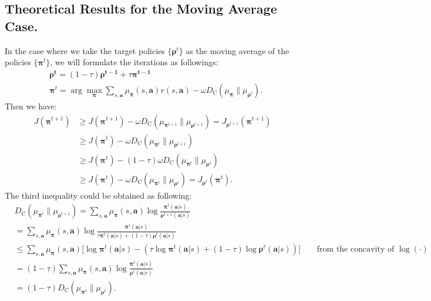 \documentclass{article}
\begin{document}
	\subsection{Theoretical Results for the Moving Average Case. }
	\label{sec:app-MA}
	    In the case where we take the target policies $\{\bm{\rho}^t\}$ as the moving average of the policies $\{\bm{\pi}^t\}$, we will formulate the iterations as followings:
    \begin{align*}
        &\boldsymbol{\rho^t} = (1-\tau)\boldsymbol{\rho^{t-1}} + \tau \boldsymbol{\pi^{t-1}} \\
        &\boldsymbol{\pi}^{t} = \arg \max_{{\boldsymbol{\pi}}} \sum_{s,\boldsymbol{a}} \mu_{\boldsymbol{\pi}}(s,\boldsymbol{a}) r(s,\boldsymbol{a})  - \omega D_{\operatorname{C}} \left( \mu_{\boldsymbol{\pi}} \| \mu_{{\boldsymbol{\rho}}^t} \right).
    \end{align*}
    Then we have:
    \begin{align*}
          J(\boldsymbol{\pi}^{t + 1})
        &\ge J(\boldsymbol{\pi}^{t + 1}) - \omega D_{\operatorname{C}} \left( \mu_{\boldsymbol{\pi}^{t+1}} \| \mu_{{\boldsymbol{\rho}}^{t+1}} \right) =  J_{{\boldsymbol{\rho}}^{t+1}}(\boldsymbol{\pi}^{t + 1}) \\ 
        & \ge J(\boldsymbol{\pi}^{t }) - \omega D_{\operatorname{C}} \left( \mu_{\boldsymbol{\pi}^{t}} \| \mu_{{\boldsymbol{\rho}}^{t+1}} \right) \\
        & \ge  J(\boldsymbol{\pi}^{t }) - (1-\tau)\omega D_{\operatorname{C}} \left( \mu_{\boldsymbol{\pi}^{t}} \| \mu_{{\boldsymbol{\rho}}^{t}} \right)
        \\
        & \ge J(\boldsymbol{\pi}^{t }) - \omega D_{\operatorname{C}} \left( \mu_{\boldsymbol{\pi}^{t}} \| \mu_{{\boldsymbol{\rho}}^{t}} \right) =  J_{{\boldsymbol{\rho}}^{t}}(\boldsymbol{\pi}^{t}).   
    \end{align*}
    The third inequality could be obtained as following:
    \begin{align*}
     & D_{\operatorname{C}} \left( \mu_{\boldsymbol{\pi}^{t}} \| \mu_{{\boldsymbol{\rho}}^{t+1}} \right)  = \sum_{s,\boldsymbol{a}} \mu_{\boldsymbol{\pi}}(s,\boldsymbol{a}) \log \frac{{\bm{\pi}}^t(\bm{a}|s)}{{\bm{\rho}}^{t+1}(\bm{a}|s)} \\
         & = \sum_{s,\boldsymbol{a}} \mu_{\boldsymbol{\pi}}(s,\boldsymbol{a}) \log \frac{{\bm{\pi}}^t(\bm{a}|s)}{\tau{\bm{\pi}}^{t}(\bm{a}|s) + (1-\tau){\bm{\rho}}^t(\bm{a}|s) } \\
         & \le \sum_{s,\boldsymbol{a}} \mu_{\boldsymbol{\pi}}(s,\boldsymbol{a}) \bigg[\log {\bm{\pi}}^t(\bm{a}|s) - \left(\tau \log {\bm{\pi}}^{t}(\bm{a}|s) + (1-\tau) \log {\bm{\rho}}^t(\bm{a}|s)  \right) \bigg] \qquad \text{from the concavity of $\log(\cdot)$} \\
         & = (1-\tau)\sum_{s,\boldsymbol{a}} \mu_{\boldsymbol{\pi}}(s,\boldsymbol{a}) \log \frac{{\bm{\pi}}^t(\bm{a}|s)}{{\bm{\rho}}^{t}(\bm{a}|s)} \\
         & = (1-\tau)D_{\operatorname{C}} \left( \mu_{\boldsymbol{\pi}^{t}} \| \mu_{{\boldsymbol{\rho}}^{t}} \right).
     \end{align*}
\end{document}
